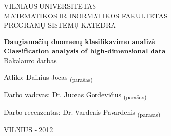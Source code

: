 \begin{titlepage}

\begin{center}
VILNIAUS UNIVERSITETAS\\
MATEMATIKOS IR INORMATIKOS FAKULTETAS\\
PROGRAMŲ SISTEMŲ KATEDRA\\
\vspace{150pt}

\huge \textbf{Daugiamačių duomenų klasifikavimo analizė\\}
\vspace{20pt}
\large\textbf{Classification analysis of high-dimensional data\\}
\vspace{20pt}
\small Bakalauro darbas\\
\vspace{40pt}
\end{center} 


\begin{flushleft}
Atliko: \hspace{50pt} Dainius Jocas \hspace{105pt}\textsubscript{(para\v{s}as)}

\vspace{10pt}
Darbo vadovas: \hspace{12pt} Dr. Juozas Gordevičius \hspace{65pt}\textsubscript{(para\v{s}as)}

\vspace{10pt}
Darbo recenzentas: Dr. Vardenis Pavardenis \hspace{50pt}\textsubscript{(para\v{s}as)}
\\
\vspace{130pt}
\end{flushleft}

\begin{center}
VILNIUS - 2012
\end{center}

\end{titlepage}